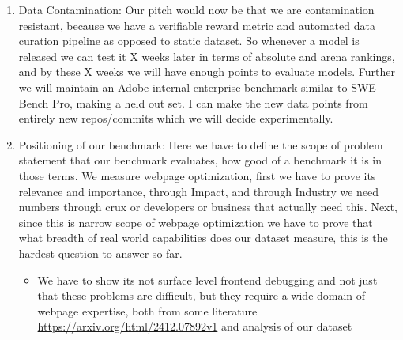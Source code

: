 \begin{enumerate}
    \begin{itemize}
        \item Web Users: By improving CWV we improve the web experience of the whole world look up the exact stats in this and \url{https://blog.chromium.org/2023/11/how-core-web-vitals-saved-users-10000.html} use current CrUX or internet traffic data to see that as of 2025 how much time e.g. 20,000 years of users do we show.
        \item Business: Case studies from deloitte etc, how many websites can we get to good scores and 100ms leading to improved outcomes etc
        \item Developer, How much developer productivity is improved, i.e. with what expertise and how many hours does it take for a CWV expeert or normal developer to fix a CWV issue: 1. For experts we will run human study with CWV experts at Adobe, for devs find repos with lighthouse installed somehow, either through gh api, static dataset (stack etc), dataset of commits (figure out), then find PRs/commits that explicitly aim to solve CWVs through commit messages and diffs, then find the avg number of hours or tries (through prev commits to solve these issues)
    \end{itemize}
    \item Data Contamination: Our pitch would now be that we are contamination resistant, because we have a verifiable reward metric and automated data curation pipeline as opposed to static dataset. So whenever a model is released we can test it X weeks later in terms of absolute and arena rankings, and by these X weeks we will have enough points to evaluate models. Further we will maintain an Adobe internal enterprise benchmark similar to SWE-Bench Pro, making a held out set. I can make the new data points from entirely new repos/commits which we will decide experimentally.
    \item Positioning of our benchmark: Here we have to define the scope of problem statement that our benchmark evaluates, how good of a benchmark it is in those terms. We measure webpage optimization, first we have to prove its relevance and importance, through Impact, and through Industry we need numbers through crux or developers or business that actually need this. Next, since this is narrow scope of webpage optimization we have to prove that what breadth of real world capabilities does our dataset measure, this is the hardest question to answer so far.
    \begin{itemize}
        \item We have to show its not surface level frontend debugging and not just that these problems are difficult, but they require a wide domain of webpage expertise, both from some literature \url{https://arxiv.org/html/2412.07892v1} and analysis of our dataset

\end{itemize}
\end{enumerate}
